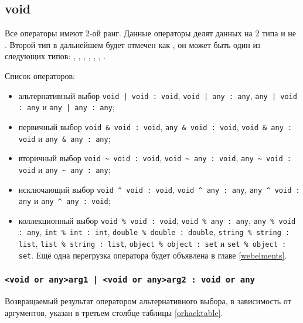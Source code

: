 \documentclass[a4paper, 14pt]{extarticle}
\newenvironment{icItems}
	{ \begin{itemize} [noitemsep,nolistsep] }
	{ \end{itemize} }
\begin{document}
\subsection{\color{bluemarin}void}
	
Все  операторы имеют 2-ой ранг. Данные операторы делят данных на 2 типа  и не . Второй тип в дальнейшем будет отмечен как , он может быть один из следующих типов: , , , , , , .
	
Список  операторов:

\begin{icItems}
	\item альтернативный выбор \lstinline`void | void : void`, \lstinline`void | any : any`, \lstinline`any | void : any` и \lstinline`any | any : any`;
	
	\item первичный выбор \lstinline`void & void : void`, \lstinline`any & void : void`, \lstinline`void & any : void` и \lstinline`any & any : any`;

	\item вторичный выбор \lstinline`void ~ void : void`, \lstinline`void ~ any : void`, \lstinline`any ~ void : void` и \lstinline`any ~ any : any`;
	
	\item исключающий выбор \lstinline`void ^ void : void`, \lstinline`void ^ any : any`, \lstinline`any ^ void : any` и \lstinline`any ^ any : void`;

	\item коллекционный выбор \lstinline`void % void : void`, \lstinline`void % any : any`, \lstinline`any % void : any`, \lstinline`int % int : int`, \lstinline`double % double : double`, \lstinline`string % string : list`, \lstinline`list % string : list`, \lstinline`object % object : set` и \lstinline`set % object : set`. Ещё одна перегрузка оператора будет объявлена в главе \ref{webelments}.
\end{icItems}

\subsubsection{\lstinline`<void or any>arg1 | <void or any>arg2 : void or any`}

Возвращаемый результат оператором альтернативного выбора, в зависимость от аргументов, указан в третьем столбце таблицы \ref{orhacktable}.
\end{document}

